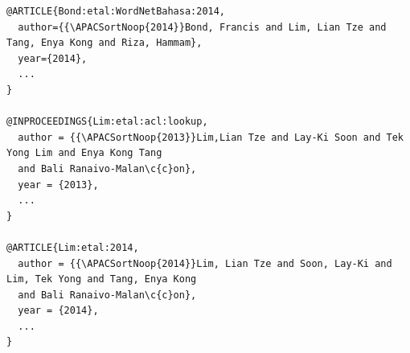 \documentclass[a4paper,nofonts,raggedright,titlepage,openany]{tufte-book}
\begin{document}

\begin{verbatim}
@ARTICLE{Bond:etal:WordNetBahasa:2014,
  author={{\APACSortNoop{2014}}Bond, Francis and Lim, Lian Tze and Tang, Enya Kong and Riza, Hammam},
  year={2014},
  ...
}

@INPROCEEDINGS{Lim:etal:acl:lookup,
  author = {{\APACSortNoop{2013}}Lim,Lian Tze and Lay-Ki Soon and Tek Yong Lim and Enya Kong Tang
  and Bali Ranaivo-Malan\c{c}on},
  year = {2013},
  ...
}

@ARTICLE{Lim:etal:2014,
  author = {{\APACSortNoop{2014}}Lim, Lian Tze and Soon, Lay-Ki and Lim, Tek Yong and Tang, Enya Kong
  and Bali Ranaivo-Malan\c{c}on},
  year = {2014},
  ...
}
\end{verbatim}

\nobibliography*

\end{document}
